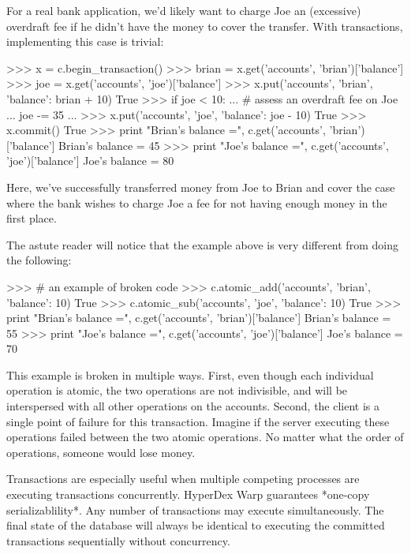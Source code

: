 For a real bank application, we'd likely want to charge Joe an (excessive)
overdraft fee if he didn't have the money to cover the transfer.  With
transactions, implementing this case is trivial:

\begin{pyconcode}
>>> x = c.begin_transaction()
>>> brian = x.get('accounts', 'brian')['balance']
>>> joe = x.get('accounts', 'joe')['balance']
>>> x.put('accounts', 'brian', {'balance': brian + 10})
True
>>> if joe < 10:
...     # assess an overdraft fee on Joe
...     joe -= 35
...
>>> x.put('accounts', 'joe', {'balance': joe - 10})
True
>>> x.commit()
True
>>> print "Brian's balance =", c.get('accounts', 'brian')['balance']
Brian's balance = 45
>>> print "Joe's balance =", c.get('accounts', 'joe')['balance']
Joe's balance = 80
\end{pyconcode}

Here, we've successfully transferred money from Joe to Brian and cover the case
where the bank wishes to charge Joe a fee for not having enough money in the
first place.

The astute reader will notice that the example above is very different from
doing the following:

\begin{pyconcode}
>>> # an example of broken code
>>> c.atomic_add('accounts', 'brian', {'balance': 10})
True
>>> c.atomic_sub('accounts', 'joe', {'balance': 10})
True
>>> print "Brian's balance =", c.get('accounts', 'brian')['balance']
Brian's balance = 55
>>> print "Joe's balance =", c.get('accounts', 'joe')['balance']
Joe's balance = 70
\end{pyconcode}

This example is broken in multiple ways.  First, even though each individual
operation is atomic, the two operations are not indivisible, and will be
interspersed with all other operations on the accounts.  Second, the client is a
single point of failure for this transaction.  Imagine if the server executing
these operations failed between the two atomic operations.  No matter what the
order of operations, someone would lose money.

Transactions are especially useful when multiple competing processes are
executing transactions concurrently.  HyperDex Warp guarantees *one-copy
serializablility*.  Any number of transactions may execute simultaneously.
The final state of the database will always be identical to executing the
committed transactions sequentially without concurrency.

